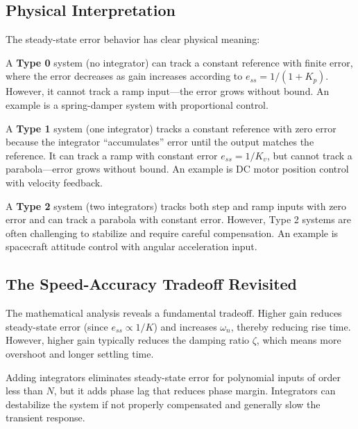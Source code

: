 \subsection{Physical Interpretation}

The steady-state error behavior has clear physical meaning:

A \textbf{Type 0} system (no integrator) can track a constant reference with finite error, where the error decreases as gain increases according to $e_{ss} = 1/(1+K_p)$. However, it cannot track a ramp input---the error grows without bound. An example is a spring-damper system with proportional control.

A \textbf{Type 1} system (one integrator) tracks a constant reference with zero error because the integrator ``accumulates'' error until the output matches the reference. It can track a ramp with constant error $e_{ss} = 1/K_v$, but cannot track a parabola---error grows without bound. An example is DC motor position control with velocity feedback.

A \textbf{Type 2} system (two integrators) tracks both step and ramp inputs with zero error and can track a parabola with constant error. However, Type 2 systems are often challenging to stabilize and require careful compensation. An example is spacecraft attitude control with angular acceleration input.

\subsection{The Speed-Accuracy Tradeoff Revisited}

The mathematical analysis reveals a fundamental tradeoff. Higher gain reduces steady-state error (since $e_{ss} \propto 1/K$) and increases $\omega_n$, thereby reducing rise time. However, higher gain typically reduces the damping ratio $\zeta$, which means more overshoot and longer settling time.

Adding integrators eliminates steady-state error for polynomial inputs of order less than $N$, but it adds phase lag that reduces phase margin. Integrators can destabilize the system if not properly compensated and generally slow the transient response.

